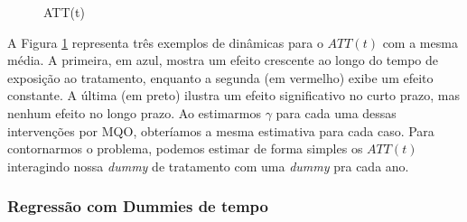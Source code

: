 \documentclass[portugues]{article}
\begin{document}
\begin{figure}[!h]
\centering
{}
\caption{ATT(t)} \label{fig:ATT(t)}
\end{figure}

A Figura \ref{fig:ATT(t)} representa três exemplos de dinâmicas para o $ATT(t)$ com a mesma média. A primeira, em azul, mostra um efeito crescente ao longo do tempo de exposição ao tratamento, enquanto a segunda (em vermelho) exibe um efeito constante. A última (em preto) ilustra um efeito significativo no curto prazo, mas nenhum efeito no longo prazo. Ao estimarmos $\gamma$ para cada uma dessas intervenções por MQO, obteríamos a mesma estimativa para cada caso. Para contornarmos o problema, podemos estimar de forma simples os $ATT(t)$ interagindo nossa \textit{dummy} de tratamento com uma \textit{dummy} pra cada ano.

\subsubsection{Regressão com Dummies de tempo}
\end{document}
